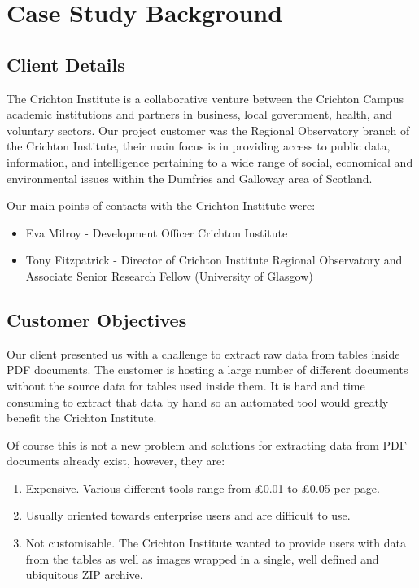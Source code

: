 \documentclass{l3proj}
\begin{document}
\newpage
\section{Case Study Background}
\label{sec:background}

\subsection{Client Details}
\label{sec:proj_cust}

The Crichton Institute is a collaborative venture between the Crichton Campus academic institutions and partners in business, local government, health, and voluntary sectors. Our project customer was the Regional Observatory branch of the Crichton Institute, their main focus is in providing access to public data, information, and intelligence pertaining to a wide range of social, economical and environmental issues within the Dumfries and Galloway area of Scotland.

Our main points of contacts with the Crichton Institute were:
\begin{itemize}
    \item Eva Milroy - Development Officer  Crichton Institute
    \item Tony Fitzpatrick - Director of Crichton Institute Regional Observatory and Associate Senior Research Fellow (University of Glasgow)
\end{itemize}

\subsection{Customer Objectives}
\label{sec:cust_obj}
Our client presented us with a challenge to extract raw data from tables inside PDF documents. The customer is hosting a large number of different documents without the source data for tables used inside them. It is hard and time consuming to extract that data by hand so an automated tool would greatly benefit the Crichton Institute. 

Of course this is not a new problem and solutions for extracting data from PDF documents already exist, however, they are:
\begin{enumerate}
    \item Expensive. Various different tools range from \pounds0.01 to \pounds0.05 per page.
    \item Usually oriented towards enterprise users and are difficult to use.
    \item Not customisable. The Crichton Institute wanted to provide users with data from the tables as well as images wrapped in a single, well defined and ubiquitous ZIP archive.
\end{enumerate}
\end{document}
